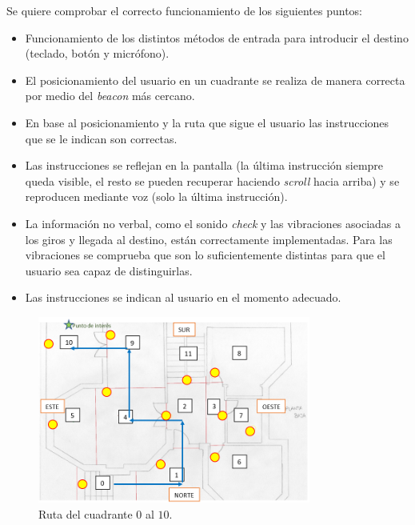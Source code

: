 Se quiere comprobar el correcto funcionamiento de los siguientes puntos:
\begin{itemize}
	
	\item Funcionamiento de los distintos métodos de entrada para introducir el destino (teclado, botón y micrófono).
	
	\item El posicionamiento del usuario en un cuadrante se realiza de manera correcta por medio del \textit{beacon} más cercano. 
	
	\item En base al posicionamiento y la ruta que sigue el usuario las instrucciones que se le indican son correctas. 
	
	\item Las instrucciones se reflejan en la pantalla (la última instrucción siempre queda visible, el resto se pueden recuperar haciendo \textit{scroll} hacia arriba) y se reproducen mediante voz (solo la última instrucción).
	
	\item La información no verbal, como el sonido \textit{check} y las vibraciones asociadas a los giros y llegada al destino, están correctamente implementadas. Para las vibraciones se comprueba que son lo suficientemente distintas para que el usuario sea capaz de distinguirlas.
	
	\item Las instrucciones se indican al usuario en el momento adecuado. 
\end{itemize}

\begin{figure}[t]
	\centering
	\includegraphics[width=0.8\textwidth]{Imagenes/Evaluacion/del0al10}
	\caption{Ruta del cuadrante $0$ al $10$.}
	\label{fig:del0al10}
\end{figure}

